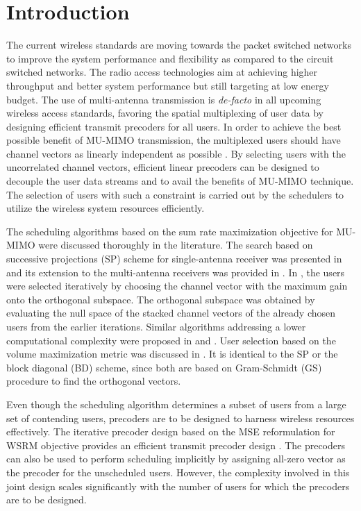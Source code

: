 \documentclass[conference,letterpaper,9pt]{./../IEEEtran}
\begin{document}
\section{Introduction}
The current wireless standards are moving towards the packet switched networks to improve the system performance and flexibility as compared to the circuit switched networks. The radio access technologies aim at achieving higher throughput and better system performance but still targeting at low energy budget. The use of multi-antenna transmission is \textit{de-facto} in all upcoming wireless access standards, favoring the spatial multiplexing of user data by designing efficient transmit precoders for all users. In order to achieve the best possible benefit of \ac{MU-MIMO} transmission, the multiplexed users should have channel vectors as linearly independent as possible \cite{sun2009eigenmode}. By selecting users with the uncorrelated channel vectors, efficient linear precoders can be designed to decouple the user data streams and to avail the benefits of \ac{MU-MIMO} technique. The selection of users with such a constraint is carried out by the schedulers to utilize the wireless system resources efficiently.

The scheduling algorithms based on the sum rate maximization objective for \ac{MU-MIMO} were discussed thoroughly in the literature. The search based on successive projections (SP) scheme for single-antenna receiver was presented in \cite{sus2006zfbf} and its extension to the multi-antenna receivers was provided in \cite{Tolli-etal-2005}. In \cite{Tolli-etal-2005}, the users were selected iteratively by choosing the channel vector with the maximum gain onto the orthogonal subspace. The orthogonal subspace was obtained by evaluating the null space of the stacked channel vectors of the already chosen users from the earlier iterations. Similar algorithms addressing a lower computational complexity were proposed in \cite{shen2006low} and \cite{youtuan2007improved}. User selection based on the volume maximization metric was discussed in \cite{jin2010novel}. It is identical to the SP or the block diagonal (BD) scheme, since both are based on Gram-Schmidt (GS) procedure to find the orthogonal vectors.

Even though the scheduling algorithm determines a subset of users from a large set of contending users, precoders are to be designed to harness wireless resources effectively. The iterative precoder design based on the \ac{MSE} reformulation for \ac{WSRM} objective provides an efficient transmit precoder design \cite{wmmse_shi}. The precoders can also be used to perform scheduling implicitly by assigning all-zero vector as the precoder for the unscheduled users. However, the complexity involved in this joint design scales significantly with the number of users for which the precoders are to be designed.
\end{document}
